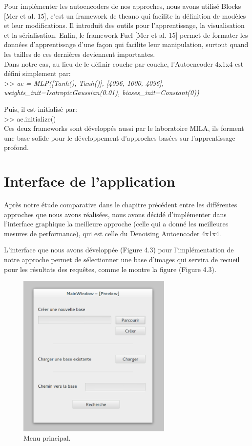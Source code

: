 	Pour implémenter les autoencoders de nos approches, nous avons utilisé Blocks [Mer et al. 15], c'est un framework de theano qui facilite la définition de modèles et leur modifications. Il introduit des outils pour l'apprentissage, la visualisation et la sérialisation. Enfin, le framework Fuel [Mer et al. 15] permet de formater les données d'apprentissage d'une façon qui facilite leur manipulation, surtout quand les tailles de ces dernières deviennent importantes.\\

	Dans notre cas, au lieu de le définir couche par couche, l'Autoencoder 4x1x4 est défini simplement par:\\

>> \textit{ae = MLP([Tanh(), Tanh()], [4096, 1000, 4096],
              weights\_init=IsotropicGaussian(0.01),
              biases\_init=Constant(0))\\
   }           

Puis, il est initialisé par:\\

>> ae.initialize()\\

	Ces deux frameworks sont développés aussi par le laboratoire MILA, ils forment une base solide pour le développement d’approches basées sur l'apprentissage profond.

\section{Interface de l'application}

	Après notre étude comparative dans le chapitre précédent entre les différentes approches que nous avons réalisées, nous avons décidé d'implémenter dans l'interface graphique la meilleure approche (celle qui a donné les meilleures mesures de performance), qui est celle du Denoising Autoencoder 4x1x4.

	L'interface que nous avons développée (Figure 4.3) pour l'implémentation de notre approche permet de sélectionner une base d'images qui servira de recueil pour les résultats des requêtes, comme le montre la figure (Figure 4.3).


\begin{figure}[H]
	\centering
		\includegraphics[width=3in]{Figures/mainMenu.png}
	\caption[Menu principal]{Menu principal.}
	\label{fig:Electron}
\end{figure}

